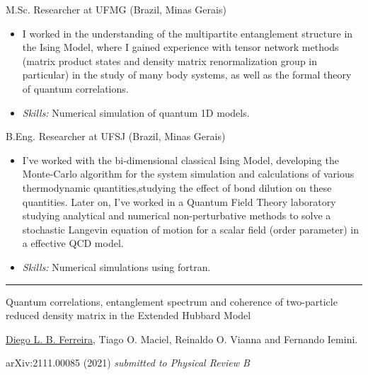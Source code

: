 \documentclass[a4paper,10pt]{article}
\newlength{\cvcolumngapwidth}
\newlength{\cvleftcolumnwidth}
\newlength{\cvrightcolumnwidth}
\newcommand{\cvsectionstyle}[1]{{\normalsize\cvsectionfont\textcolor{cvsectioncolor}{#1}}}
\newcommand{\cvtitlestyle}[1]{{\normalsize\cvtitlefont\textcolor{cvtitlecolor}{#1}}}
\newcommand{\cvdurationstyle}[1]{{\normalsize\cvdurationfont\textcolor{cvdurationcolor}{#1}}}
\newlength{\cvafteritemskipamount}
\newlength{\cvaftersectionskipamount}
\newlength{\cvaftertitleskipamount}
\newlength{\cvparskip}
\newcommand{\cvsection}[1]{
    \begin{minipage}[t]{\cvleftcolumnwidth}
        \raggedleft\cvsectionstyle{#1}
    \end{minipage}%
    \hspace{\cvcolumngapwidth}%
    \begin{minipage}[t]{\cvrightcolumnwidth}
        \textcolor{cvrulecolor}{\rule{\cvrightcolumnwidth}{0.5mm}}
    \end{minipage}
    \vspace{\cvaftersectionskipamount}}
\newcommand{\cvitem}[2]{
    \begin{minipage}[t]{\cvleftcolumnwidth}
        \raggedleft #1
    \end{minipage}%
    \hspace{\cvcolumngapwidth}%
    \begin{minipage}[t]{\cvrightcolumnwidth}
        \setlength{\parskip}{\cvparskip} #2
    \end{minipage}
    \vspace{\cvafteritemskipamount}}
\newcommand{\cvtitle}[1]{
    \cvtitlestyle{#1}
    \vspace{\cvaftertitleskipamount}
    \vspace{-\cvparskip}}
\begin{document}
\cvitem{\cvdurationstyle{2014 - 2016}}
    {\cvtitle{M.Sc. Researcher at UFMG (Brazil, Minas Gerais)}

    \begin{itemize}[leftmargin=*]
        \vspace{0.2cm}
        \item I worked in the understanding of the multipartite entanglement structure in the Ising Model, where I gained experience with tensor network methods (matrix product states and density matrix renormalization group in particular) in the study of many body systems, as well as the formal theory of quantum correlations.
        \vspace{0.2cm}
        \item \textit{Skills:} Numerical simulation of quantum 1D models.
    \end{itemize}}

\cvitem{\cvdurationstyle{2010 - 2013}}
    {\cvtitle{B.Eng. Researcher at UFSJ (Brazil, Minas Gerais)}
    
    \begin{itemize}[leftmargin=*]
        \vspace{0.2cm}
        \item I've worked with the bi-dimensional classical Ising Model, developing the Monte-Carlo algorithm for the system simulation and calculations of various thermodynamic quantities,studying the effect of bond dilution on these quantities. Later on, I’ve worked in a Quantum Field Theory laboratory studying analytical and numerical non-perturbative methods to solve a stochastic Langevin equation of motion for a scalar field (order parameter) in a effective QCD model.
        \vspace{0.2cm}
        \item \textit{Skills:} Numerical simulations using fortran.
    \end{itemize}}

    \newpage
\cvsection{Scientific Production}

\cvitem{\cvdurationstyle{Preprint}}
    {\cvtitle{Quantum correlations, entanglement spectrum and coherence of two-particle reduced density matrix in the Extended Hubbard Model}
    
    \vspace{0.2cm}
    \underline{Diego L. B. Ferreira}, Tiago O. Maciel, Reinaldo O. Vianna and Fernando Iemini.
    
    \vspace{0.2cm}
    arXiv:2111.00085 (2021)
    \textit{submitted to Physical Review B}}
\end{document}
